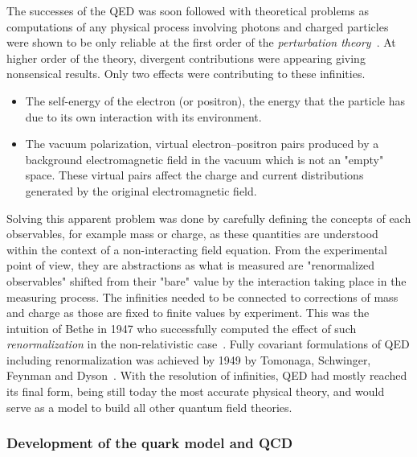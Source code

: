 	The successes of the QED was soon followed with theoretical problems as computations of any physical process involving photons and charged particles were shown to be only reliable at the first order of the \textit{perturbation theory}~\cite{OPPENHEIMER1930II}. At higher order of the theory, divergent contributions were appearing giving nonsensical results. Only two effects were contributing to these infinities.
	
	\begin{itemize}
		\item The self-energy of the electron (or positron), the energy that the particle has due to its own interaction with its environment.
		\item The vacuum polarization, virtual electron–positron pairs produced by a background electromagnetic field in the vacuum which is not an "empty" space. These virtual pairs affect the charge and current distributions generated by the original electromagnetic field.
	\end{itemize}
	
	Solving this apparent problem was done by carefully defining the concepts of each observables, for example mass or charge, as these quantities are understood within the context of a non-interacting field equation. From the experimental point of view, they are abstractions as what is measured are "renormalized observables" shifted from their "bare" value by the interaction taking place in the measuring process. The infinities needed to be connected to corrections of mass and charge as those are fixed to finite values by experiment. This was the intuition of Bethe in 1947 who successfully computed the effect of such \textit{renormalization} in the non-relativistic case~\cite{BETHE1947}. Fully covariant formulations of QED including renormalization was achieved by 1949 by Tomonaga, Schwinger, Feynman and Dyson~\cite{DYSON1949}. With the resolution of infinities, QED had mostly reached its final form, being still today the most accurate physical theory, and would serve as a model to build all other quantum field theories.
	
	\subsubsection*{Development of the quark model and \acl{QCD}}
	\label{chapt2:sssec:quark}
	
